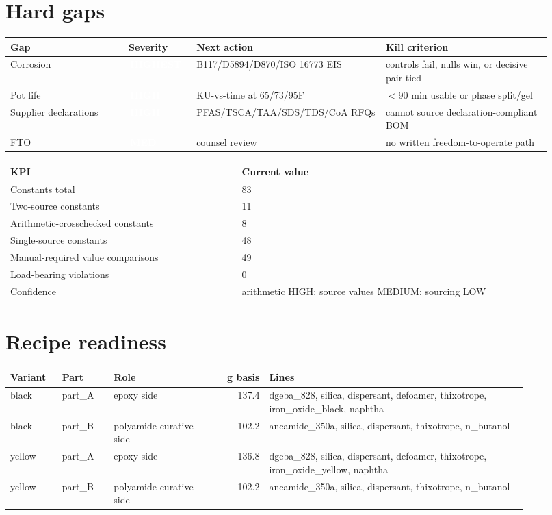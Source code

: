 \documentclass[10pt]{article}
\newcommand{\chip}[2]{\colorbox{#1}{\textcolor{white}{\scriptsize\bfseries\,#2\,}}}
\begin{document}
\section{Hard gaps}
{\footnotesize\begin{longtable}{@{}p{0.20\linewidth} p{0.11\linewidth} p{0.32\linewidth} p{0.29\linewidth}@{}}\toprule \textbf{Gap} & \textbf{Severity} & \textbf{Next action} & \textbf{Kill criterion} \\ \midrule Corrosion & \chip{cred}{HIGHEST} & B117/D5894/D870/ISO 16773 EIS & controls fail, nulls win, or decisive pair tied \\ Pot life & \chip{cred}{HIGH} & KU-vs-time at 65/73/95F & $<$90 min usable or phase split/gel \\ Supplier declarations & \chip{camber}{HIGH} & PFAS/TSCA/TAA/SDS/TDS/CoA RFQs & cannot source declaration-compliant BOM \\ FTO & \chip{camber}{MED} & counsel review & no written freedom-to-operate path \\ \bottomrule\end{longtable}}
{\footnotesize\begin{longtable}{@{}p{0.42\linewidth} p{0.50\linewidth}@{}}\toprule \textbf{KPI} & \textbf{Current value} \\ \midrule Constants total & 83 \\ Two-source constants & 11 \\ Arithmetic-crosschecked constants & 8 \\ Single-source constants & 48 \\ Manual-required value comparisons & 49 \\ Load-bearing violations & 0 \\ Confidence & arithmetic HIGH; source values MEDIUM; sourcing LOW \\ \bottomrule\end{longtable}}
\newpage
\section{Recipe readiness}
{\scriptsize\begin{longtable}{@{}p{0.10\linewidth} p{0.10\linewidth} p{0.18\linewidth} r p{0.50\linewidth}@{}}\toprule \textbf{Variant} & \textbf{Part} & \textbf{Role} & \textbf{g basis} & \textbf{Lines} \\ \midrule black & part\_A & epoxy side & 137.4 & dgeba\_828, silica, dispersant, defoamer, thixotrope, iron\_oxide\_black, naphtha \\ black & part\_B & polyamide-curative side & 102.2 & ancamide\_350a, silica, dispersant, thixotrope, n\_butanol \\ yellow & part\_A & epoxy side & 136.8 & dgeba\_828, silica, dispersant, defoamer, thixotrope, iron\_oxide\_yellow, naphtha \\ yellow & part\_B & polyamide-curative side & 102.2 & ancamide\_350a, silica, dispersant, thixotrope, n\_butanol \\ \bottomrule\end{longtable}}
\newpage
\end{document}
